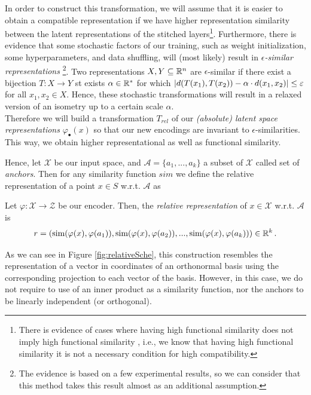 \documentclass[../main.tex]{subfiles}
\begin{document}
In order to construct this transformation, we will assume that it is easier to obtain a compatible representation if we have higher representation similarity between the latent representations of the stitched layers\footnote{There is evidence of cases where having high functional similarity does not imply high functional similarity \cite{csiszarik_similarity_2021}, i.e., we know that having high functional similarity it is not a necessary condition for high compatibility.}. Furthermore, there is evidence that some stochastic factors of our training, such as weight initialization, some hyperparameters, and data shuffling, will (most likely) result in \emph{$\epsilon$-similar representations} \cite{moschella_relative_2022}\footnote{The evidence is based on a few experimental results, so we can consider that this method takes this result almost as an additional assumption.}. Two representations $X,Y \subseteq \mathbb{R}^n$ are $\epsilon$-similar if there exist a bijection $T:X \to Y$ st exists $\alpha \in \mathbb{R}^*$ for which $\left\lvert d(T(x_1), T(x_2)) - \alpha \cdot d(x_1,x_2) \right\rvert \leq \varepsilon$ for all $x_1,x_2 \in X$. Hence, these stochastic transformations will result in a relaxed version of an isometry up to a certain scale $\alpha$.\\

Therefore we will build a transformation $T_{rel}$ of our \emph{(absolute) latent space representations} $\varphi_\bullet(x)$ so that our new encodings are invariant to $\epsilon$-similarities. This way, we obtain higher representational as well as functional similarity.

Hence, let $\mathcal{X}$ be our input space, and $\mathcal{A}= \{a_1, ..., a_k\}$ a subset of $\mathcal{X}$ called set of \emph{anchors}. Then for any similarity function $sim$ we define the relative representation of a point $x\in S$  w.r.t. $\mathcal{A}$ as

\begin{definition}
Let $\varphi:\mathcal{X} \to \mathcal{Z}$ be our encoder. Then, the \emph{relative representation} of $x \in \mathcal{X}$ w.r.t. $\mathcal{A}$ is
\[
r = (\text{sim}(\varphi(x), \varphi(a_1)), \text{sim}(\varphi(x), \varphi(a_2)), ..., \text{sim}(\varphi(x), \varphi(a_k))) \in \mathbb{R}^k\,.
\]
\end{definition}


\begin{remark}
As we can see in Figure \ref{fig:relativeSche}, this construction resembles the representation of a vector in coordinates of an orthonormal basis using the corresponding projection to each vector of the basis. However, in this case, we do not require to use of an inner product as a similarity function, nor the anchors to be linearly independent (or orthogonal).
\end{remark}
\end{document}
